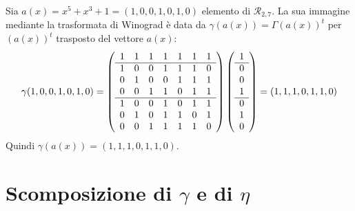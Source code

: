 \begin{esempio}
   Sia $a(x) = x^5 + x^3 + 1 = (1,0,0,1,0,1,0)$ elemento di $\mathcal{R}_{2,7} $. La sua immagine mediante la trasformata di Winograd è data da $\gamma(a(x)) = \Gamma (a(x))^{t}$ per $(a(x))^{t}$ trasposto del vettore $a(x)$:
   \begin{align*}
    \gamma(1,0,0,1,0,1,0) =
    \left(
    \begin{array} { c c c c c c c c}
    1 & 1 & 1 & 1 & 1 & 1 & 1  \\
    \hline
    1 & 0 & 0 & 1 & 1 & 1 & 0  \\
    0 & 1 & 0 & 0 & 1 & 1 & 1  \\
    0 & 0 & 1 & 1 & 0 & 1 & 1  \\
    \hline
    1 & 0 & 0 & 1 & 0 & 1 & 1  \\
    0 & 1 & 0 & 1 & 1 & 0 & 1  \\
    0 & 0 & 1 & 1 & 1 & 1 & 0
    \end{array}
    \right)
    \left(
    \begin{array} { c }
    1  \\
    \hline
    0   \\
    0  \\
    1   \\
    \hline
    0   \\
    1   \\
    0
    \end{array}
    \right)
    =
    (1,1,1,0,1,1,0)
    \end{align*}
   Quindi $\gamma(a(x)) = (1,1,1,0,1,1,0)$.
\end{esempio}

\section{Scomposizione di $\gamma$ e di $\eta$}

